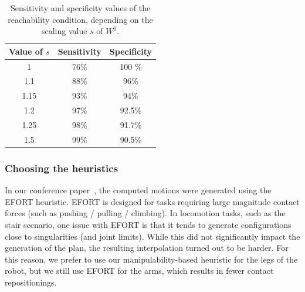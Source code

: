 \documentclass[journal]{IEEEtran}
\providecommand{\DIFaddtex}[1]{#1} %
\providecommand{\DIFdeltex}[1]{} %
\providecommand{\DIFaddbegin}{\protect\color{blue}} %
\providecommand{\DIFaddend}{\protect\color{black}} %
\providecommand{\DIFdelbegin}{\protect\cbdelete} %
\providecommand{\DIFdelend}{} %
\providecommand{\DIFadd}[1]{\texorpdfstring{\DIFaddtex{#1}}{#1}} %
\providecommand{\DIFdel}[1]{\texorpdfstring{\DIFdeltex{#1}}{}} %
\begin{document}
\begin{table}
\centering
\footnotesize
\begin{tabular}{c | c | c}
   Value of $s$ &  Sensitivity & Specificity\\
 \hline
   1   & 76\% & 100 \%\\
   1.1& 88\% & 96\% \\
   1.15& 93\% & 94\%\\
   1.2 & 97\% & 92.5\%\\
   1.25& 98\% & 91.7\%\\
   1.5 & 99\% & 90.5\%\\
 \end{tabular}
\caption{Sensitivity and specificity values of the reachability condition, depending on the scaling value $s$ of $W^0$.}
\label{tab:scale}
\quad
\end{table}

\subsubsection{Choosing the heuristics} \label{sec:heuristichoices}
In our conference paper~\citep{tonneauisrr15}, the computed motions were generated using the EFORT heuristic.
EFORT is designed for tasks requiring \DIFdelbegin \DIFdel{to exert important }\DIFdelend \DIFaddbegin \DIFadd{large magnitude contact }\DIFaddend forces (such as pushing / pulling / climbing). 
In locomotion tasks, such as the stair scenario, one issue with EFORT is that it tends to generate
configurations close to singularities (and joint limits). While this did not significantly impact
the generation of the plan, the resulting interpolation turned out to be harder.
For this reason, we prefer to use our manipulability-based heuristic for the legs of the robot, but we still
use EFORT for the arms, which results in fewer contact repositionings.

\end{document}
